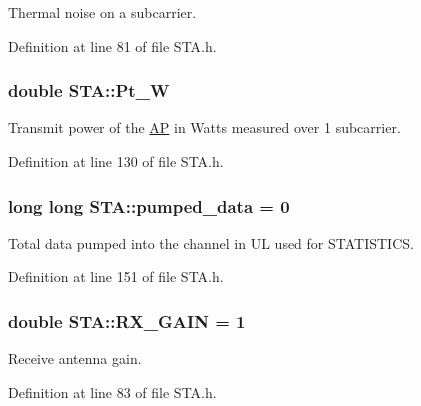 Thermal noise on a subcarrier. 



Definition at line 81 of file S\-T\-A.\-h.

\hypertarget{classSTA_a8ec6260021c741ccc08a6ec25793c1f3}{
\subsubsection[{Pt\-\_\-\-W}]{\setlength{\rightskip}{0pt plus 5cm}double S\-T\-A\-::\-Pt\-\_\-\-W}}\label{classSTA_a8ec6260021c741ccc08a6ec25793c1f3}


Transmit power of the \hyperlink{classAP}{A\-P} in Watts measured over 1 subcarrier. 



Definition at line 130 of file S\-T\-A.\-h.

\hypertarget{classSTA_ae42a5d6c3c4f06388c9dae400b8d2661}{
\subsubsection[{pumped\-\_\-data}]{\setlength{\rightskip}{0pt plus 5cm}long long S\-T\-A\-::pumped\-\_\-data = 0}}\label{classSTA_ae42a5d6c3c4f06388c9dae400b8d2661}


Total data pumped into the channel in U\-L used for S\-T\-A\-T\-I\-S\-T\-I\-C\-S. 



Definition at line 151 of file S\-T\-A.\-h.

\hypertarget{classSTA_a4486a94dba2121db6931da1fb650dc19}{
\subsubsection[{R\-X\-\_\-\-G\-A\-I\-N}]{\setlength{\rightskip}{0pt plus 5cm}double S\-T\-A\-::\-R\-X\-\_\-\-G\-A\-I\-N = 1\hspace{0.3cm}{\ttfamily [private]}}}\label{classSTA_a4486a94dba2121db6931da1fb650dc19}


Receive antenna gain. 



Definition at line 83 of file S\-T\-A.\-h.

